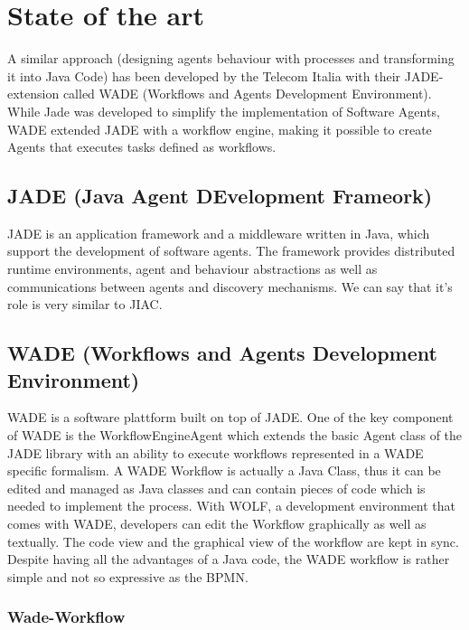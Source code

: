 \chapter{State of the art}

A similar approach (designing agents behaviour with processes and transforming it into Java Code) has been developed by the Telecom Italia with their JADE-extension called WADE (Workflows and Agents Development Environment). While Jade was developed to simplify the implementation of Software Agents, WADE extended JADE with a workflow engine, making it possible to create Agents that executes tasks defined as workflows.

\section{JADE (\textbf{J}ava \textbf{A}gent \textbf{DE}velopment Frameork)}
JADE is an application framework and a middleware written in Java, which support the development of software agents. The framework  provides distributed runtime environments, agent and behaviour abstractions as well as communications between agents and discovery mechanisms. We can say that it's role is very similar to JIAC.

\section{WADE (Workflows and Agents Development Environment)}
WADE \cite{16,10,12} is a software plattform built on top of JADE. One of the key component of WADE is the WorkflowEngineAgent which extends the basic Agent class of the JADE library with an ability to execute workflows represented in a WADE specific formalism.
A WADE Workflow is actually a Java Class, thus it can be edited and managed as Java classes and can contain pieces of code which is needed to implement the process. With WOLF, a development environment that comes with WADE, developers can edit the Workflow graphically as well as textually. The code view and the graphical view of the workflow are kept in sync. 
Despite having all the advantages of a Java code, the WADE workflow is rather simple and not so expressive as the BPMN.

\subsection{Wade-Workflow}

